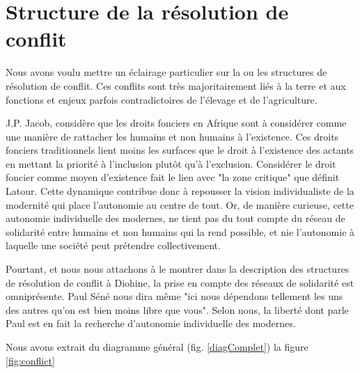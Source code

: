 \section{Structure de la résolution de conflit}

Nous avons voulu mettre un éclairage particulier sur la ou les structures de résolution de conflit. Ces conflits sont très majoritairement liés à la terre et aux fonctions et enjeux parfois contradictoires de l'élevage et de l'agriculture.

J.P. Jacob\cite{jacob_terres_2007}, considère que les droits fonciers en Afrique sont à considérer comme une manière de rattacher les humains et non humains à l'existence. Ces droits fonciers traditionnels lient moins les surfaces que le droit à l'existence des actants en mettant la priorité à l'inclusion plutôt qu'à l'exclusion. Considérer le droit foncier comme moyen d'existence fait le lien avec "la zone critique" que définit Latour\cite{latour_face_2015}. Cette dynamique contribue donc à repousser la vision individualiste de la modernité qui place l'autonomie au centre de tout. Or, de manière curieuse, cette autonomie individuelle des modernes, ne tient pas du tout compte du réseau de solidarité entre humains et non humains qui la rend possible, et nie l'autonomie à laquelle une société peut prétendre collectivement.

Pourtant, et nous nous  attachons à le montrer dans la description des structures de résolution de conflit à Diohine, la prise en compte des réseaux de solidarité est omniprésente. Paul Séné nous dira même "ici nous dépendons tellement les uns des autres qu'on est bien moins libre que vous". Selon nous, la liberté dont parle Paul est en fait la recherche d'autonomie individuelle des modernes.


Nous avons extrait du diagramme général (fig. \ref{diagComplet}) la figure \ref{fig:conflict}

